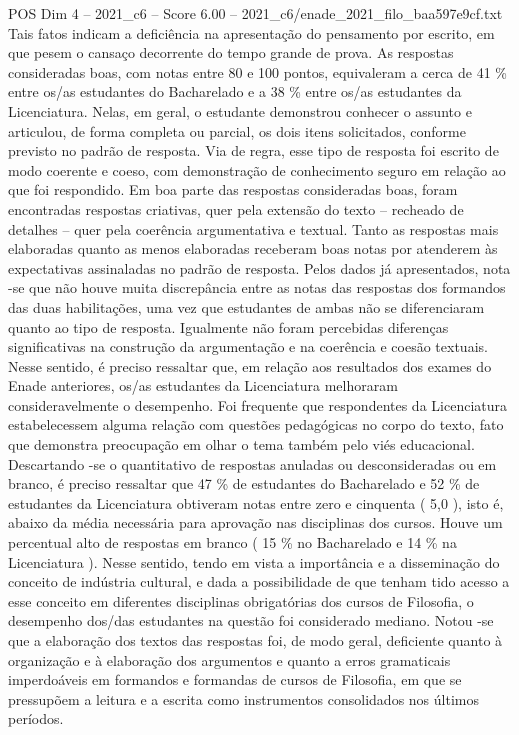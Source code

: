 \begin{textsample}{POS Dim 4 – 2021\_c6 – Score 6.00 – 2021\_c6/enade\_2021\_filo\_baa597e9cf.txt}
Tais fatos indicam a deficiência na apresentação do pensamento por escrito, em que pesem o cansaço decorrente do tempo grande de prova.
As respostas consideradas boas, com notas entre 80 e 100 pontos, equivaleram a cerca de 41 \% entre os/as estudantes do Bacharelado e a 38 \% entre os/as estudantes da Licenciatura.
Nelas, em geral, o estudante demonstrou conhecer o assunto e articulou, de forma completa ou parcial, os dois itens solicitados, conforme previsto no padrão de resposta.
Via de regra, esse tipo de resposta foi escrito de modo coerente e coeso, com demonstração de conhecimento seguro em relação ao que foi respondido.
Em boa parte das respostas consideradas boas, foram encontradas respostas criativas, quer pela extensão do texto – recheado de detalhes – quer pela coerência argumentativa e textual.
Tanto as respostas mais elaboradas quanto as menos elaboradas receberam boas notas por atenderem às expectativas assinaladas no padrão de resposta.
Pelos dados já apresentados, nota -se que não houve muita discrepância entre as notas das respostas dos formandos das duas habilitações, uma vez que estudantes de ambas não se diferenciaram quanto ao tipo de resposta.
Igualmente não foram percebidas diferenças significativas na construção da argumentação e na coerência e coesão textuais.
Nesse sentido, é preciso ressaltar que, em relação aos resultados dos exames do Enade anteriores, os/as estudantes da Licenciatura melhoraram consideravelmente o desempenho.
Foi frequente que respondentes da Licenciatura estabelecessem alguma relação com questões pedagógicas no corpo do texto, fato que demonstra preocupação em olhar o tema também pelo viés educacional.
Descartando -se o quantitativo de respostas anuladas ou desconsideradas ou em branco, é preciso ressaltar que 47 \% de estudantes do Bacharelado e 52 \% de estudantes da Licenciatura obtiveram notas entre zero e cinquenta ( 5,0 ), isto é, abaixo da média necessária para aprovação nas disciplinas dos cursos.
Houve um percentual alto de respostas em branco ( 15 \% no Bacharelado e 14 \% na Licenciatura ).
Nesse sentido, tendo em vista a importância e a disseminação do conceito de indústria cultural, e dada a possibilidade de que tenham tido acesso a esse conceito em diferentes disciplinas obrigatórias dos cursos de Filosofia, o desempenho dos/das estudantes na questão foi considerado mediano.
Notou -se que a elaboração dos textos das respostas foi, de modo geral, deficiente quanto à organização e à elaboração dos argumentos e quanto a erros gramaticais imperdoáveis em formandos e formandas de cursos de Filosofia, em que se pressupõem a leitura e a escrita como instrumentos consolidados nos últimos períodos.

\end{textsample}
